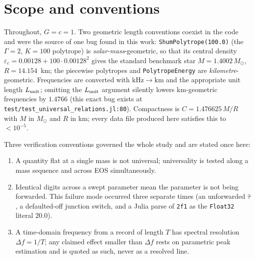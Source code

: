 \documentclass[aps,prd,preprint,amsmath,amssymb,nofootinbib,longbibliography]{revtex4-2}
\newcommand{\Msun}{M_\odot}
\begin{document}
\maketitle

\tableofcontents

\section{Scope and conventions}

Throughout, $G=c=1$. Two geometric length conventions coexist in the code and were the source
of one bug found in this work: \texttt{ShumPolytrope(100.0)} (the $\Gamma=2$, $K=100$
polytrope) is \emph{solar-mass}-geometric, so that its central density
$\varepsilon_c = 0.00128 + 100\cdot0.00128^2$ gives the standard benchmark star
$M = 1.4002\,\Msun$, $R = 14.154$~km; the piecewise polytropes and \texttt{PolytropeEnergy}
are \emph{kilometre}-geometric. Frequencies are converted with $\mathrm{kHz\to km}$ and the
appropriate unit length $L_{\rm unit}$; omitting the $L_{\rm unit}$ argument silently lowers
km-geometric frequencies by $1.4766$ (this exact bug exists at
\texttt{test/test\_universal\_relations.jl:80}). Compactness is $C = 1.476625\,M/R$ with $M$ in
$\Msun$ and $R$ in km; every data file produced here satisfies this to $<10^{-5}$.

Three verification conventions governed the whole study and are stated once here:
\begin{enumerate}
\item A quantity flat at a single mass is not universal; universality is tested along a mass
sequence and across EOS simultaneously.
\item Identical digits across a swept parameter mean the parameter is not being forwarded.
This failure mode occurred three separate times (an unforwarded $\hat\tau$, a defaulted-off
junction switch, and a Julia parse of \texttt{2f1} as the \texttt{Float32} literal $20.0$).
\item A time-domain frequency from a record of length $T$ has spectral resolution
$\Delta f = 1/T$; any claimed effect smaller than $\Delta f$ rests on parametric peak
estimation and is quoted as such, never as a resolved line.
\end{enumerate}

\end{document}
